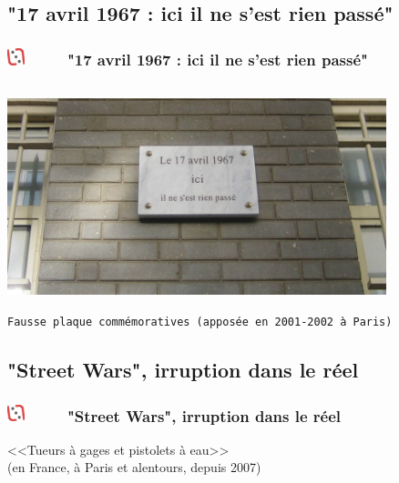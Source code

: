 \documentclass[slidetop,11pt]{beamer}
\def\moreInFrameTitleLeftt{\includegraphics[height=0.5cm]{img/ligueludique-0.png}~~~~~}
\begin{document}

\def\sectionPartIIIa{"17 avril 1967 : ici il ne s'est rien pass{\'e}"}
\subsection{\sectionPartIIIa}
\begin{frame}
	\frametitle{\moreInFrameTitleLeftt \sectionPartIIIa}
	\begin{center}
		\includegraphics[height=6.5cm,width=11.0cm]{img/84869389_o.png} ~\\ %
		\texttt{\footnotesize Fausse plaque comm{\'e}moratives (appos{\'e}e en 2001-2002 {\`a} Paris)}
	\end{center}
\end{frame}

\def\sectionPartIIIb{"Street Wars", irruption dans le r{\'e}el}
\subsection{\sectionPartIIIb}
\begin{frame}
	\frametitle{\moreInFrameTitleLeftt \sectionPartIIIb}
	\begin{center}
		<<Tueurs {\`a} gages et pistolets {\`a} eau>>~\\
		(en France, {\`a} Paris et alentours, depuis 2007)
	\end{center}
\end{frame}
\end{document}
